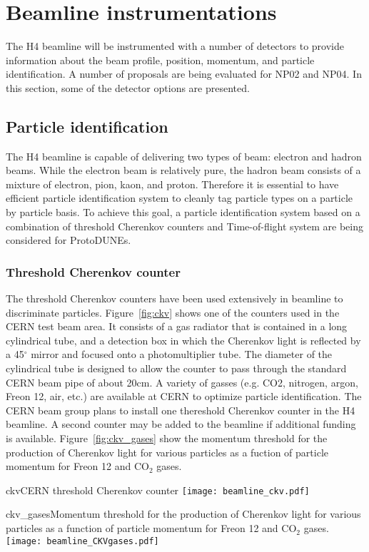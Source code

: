 \section{Beamline instrumentations}
\label{sec:beaminstruments}

The H4 beamline will be instrumented with a number of detectors to provide information about the beam profile, position, momentum, and particle identification. A number of proposals are being evaluated for NP02 and NP04. In this section, some of the detector options are presented.

\subsection{Particle identification}
The H4 beamline is capable of delivering two types of beam: electron and hadron beams. While the electron beam is relatively pure, the hadron beam consists of a mixture of electron, pion, kaon, and proton. Therefore it is essential to have efficient particle identification system to cleanly tag particle types on a particle by particle basis. To achieve this goal, a particle identification system based on a combination of threshold Cherenkov counters and Time-of-flight system are being considered for ProtoDUNEs.

\subsubsection{Threshold Cherenkov counter}
The threshold Cherenkov counters have been used extensively in beamline to discriminate particles. Figure~\ref{fig:ckv} shows one of the counters used in the CERN test beam area. It consists of a gas radiator that is contained in a long cylindrical tube, and a detection box in which the Cherenkov light is reflected by a 45$^\circ$ mirror and focused onto a photomultiplier tube. The diameter of the cylindrical tube is designed to allow the counter to pass through the standard CERN beam pipe of about 20cm. A variety of gasses (e.g. CO2, nitrogen, argon, Freon 12, air, etc.) are available at CERN to optimize particle identification. The CERN beam group plans to install one thereshold Cherenkov counter in the H4 beamline. A second counter may be added to the beamline if additional funding is available. Figure~\ref{fig:ckv_gases} show the momentum threshold for the production of Cherenkov light for various particles as a fuction of particle momentum for Freon 12 and CO$_2$ gases.
\begin{cdrfigure}{ckv}{CERN threshold Cherenkov counter}
  \texttt{[image: beamline\_ckv.pdf]}
\end{cdrfigure}
\begin{cdrfigure}{ckv_gases}{Momentum threshold for the production of Cherenkov light for various particles as a function of particle momentum for Freon 12 and CO$_2$ gases.}
  \texttt{[image: beamline\_CKVgases.pdf]}
\end{cdrfigure}


